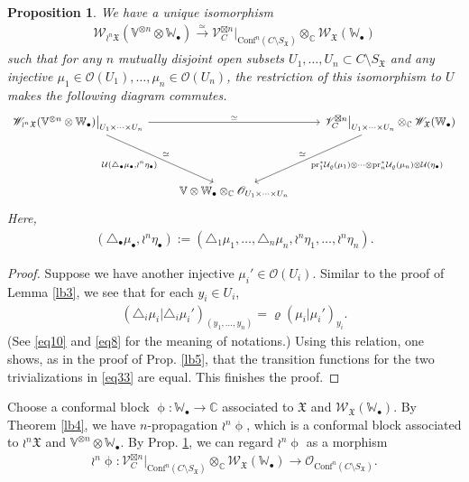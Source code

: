 \documentclass[12pt,a4paper,notitlepage]{article}
\theoremstyle{definition}
\theoremstyle{plain}
\newtheorem{pp}[df]{Proposition}
\newcommand{\fk}{\mathfrak}
\newcommand{\mc}{\mathcal}
\newcommand{\Conf}{\mathrm{Conf}}
\newcommand{\scr}{\mathscr}
\newcommand{\SX}{{S_{\fk X}}}
\newcommand{\blt}{\bullet}
\newcommand{\Vbb}{\mathbb V}
\newcommand{\Wbb}{\mathbb W}
\newcommand{\Cbb}{\mathbb C}
\newcommand{\pr}{\mathrm {pr}}
\numberwithin{equation}{section}
\begin{document}
\begin{pp}\label{lb16}
We have a unique isomorphism
\begin{align}
\scr W_{\wr^n\fk X}(\Vbb^{\otimes n}\otimes\Wbb_\blt)\xrightarrow{\simeq}\scr V_C^{\boxtimes n}\big|_{\Conf^n(C\setminus\SX)}\otimes_\Cbb \scr W_{\fk X}(\Wbb_\blt)	
\end{align}
such that for any $n$ mutually disjoint open subsets $U_1,\dots,U_n\subset C\setminus\SX$ and any injective $\mu_1\in\scr O(U_1),\dots,\mu_n\in\scr O(U_n)$, the restriction of this isomorphism to $U$ makes the following diagram commutes.
\begin{equation}
\begin{tikzcd}
\scr W_{\wr^n\fk X}(\Vbb^{\otimes n}\otimes\Wbb_\blt)\big|_{U_1\times\cdots\times U_n} \arrow[rr,"\simeq"] \arrow[ddr, "\simeq" ,"{\mc U(\triangle_\blt\mu_\blt,\wr^n\eta_\blt)}"']  && \scr V_C^{\boxtimes n}\big|_{U_1\times\cdots\times U_n}\otimes_\Cbb\scr W_{\fk X}(\Wbb_\blt)	 \arrow[ddl,"\simeq"',"{\pr_1^*\mc U_\varrho(\mu_1)\otimes\cdots\otimes\pr_n^*\mc U_\varrho(\mu_n)\otimes \mc U(\eta_\blt)}"]\\
{}\\
& \Vbb\otimes\Wbb_\blt\otimes_\Cbb \scr O_{U_1\times\cdots\times U_n}
\end{tikzcd}\label{eq33}	
\end{equation}
Here,
\begin{gather*}
(\triangle_\blt\mu_\blt,\wr^n\eta_\blt):=(\triangle_1\mu_1,\dots,\triangle_n\mu_n,\wr^n\eta_1,\dots,\wr^n\eta_n).	
\end{gather*}
\end{pp}


\begin{proof}
Suppose we have another injective $\mu_i'\in\scr O(U_i)$. Similar to the proof of Lemma \ref{lb3}, we see that for each $y_i\in U_i$,
\begin{align*}
(\triangle_i\mu_i|\triangle_i\mu_i')_{(y_1,\dots,y_n)}=\varrho(\mu_i|\mu_i')_{y_i}.	
\end{align*}
(See  \eqref{eq10} and \eqref{eq8} for the meaning of notations.) Using this relation, one shows, as in the proof of Prop. \ref{lb5}, that the transition functions for the two trivializations in \eqref{eq33} are equal. This finishes the proof.
\end{proof}




Choose a conformal block $\upphi:\Wbb_\blt\rightarrow\Cbb$ associated to $\fk X$ and $\scr W_{\fk X}(\Wbb_\blt)$. By Theorem \ref{lb4}, we have $n$-propagation $\wr^n\upphi$, which is a conformal block associated to $\wr^n\fk X$ and $\Vbb^{\otimes n}\otimes\Wbb_\blt$. By Prop. \ref{lb16}, we can regard $\wr^n\upphi$ as a morphism
\begin{align*}
\wr^n\upphi:\scr V_C^{\boxtimes n}\big|_{\Conf^n(C\setminus\SX)}\otimes_\Cbb\scr W_{\fk X}(\Wbb_\blt)	\rightarrow\scr O_{\Conf^n(C\setminus\SX)}.	
\end{align*}
\end{document}
